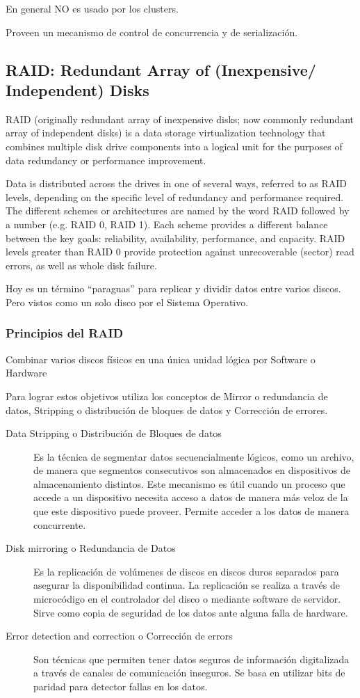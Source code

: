 \documentclass[a4paper, twoside]{article}
\begin{document}
En general NO es usado por los clusters.

Proveen un mecanismo de control de concurrencia y de serialización.

\subsection{RAID: Redundant Array of (Inexpensive/ Independent) Disks}
RAID (originally redundant array of inexpensive disks; now commonly redundant array of independent disks) is a data storage virtualization technology that combines multiple disk drive components into a logical unit for the purposes of data redundancy or performance improvement.

Data is distributed across the drives in one of several ways, referred to as RAID levels, depending on the specific level of redundancy and performance required. The different schemes or architectures are named by the word RAID followed by a number (e.g. RAID 0, RAID 1). Each scheme provides a different balance between the key goals: reliability, availability, performance, and capacity. RAID levels greater than RAID 0 provide protection against unrecoverable (sector) read errors, as well as whole disk failure.

Hoy es un término ``paraguas'' para replicar y dividir datos entre varios discos. Pero vistos como un solo disco por el Sistema Operativo.


\subsubsection{Principios del RAID}
Combinar varios discos físicos en una única unidad lógica por Software o Hardware

Para lograr estos objetivos utiliza los conceptos de Mirror o redundancia de datos, Stripping o distribución de bloques de datos y Corrección de errores.

\begin{description}
	\item[Data Stripping o Distribución de Bloques de datos] Es la técnica de segmentar datos secuencialmente lógicos, como un archivo, de manera que segmentos consecutivos son almacenados en dispositivos de almacenamiento distintos. Este mecanismo es útil cuando un proceso que accede a un dispositivo necesita acceso a datos de manera más veloz de la que este dispositivo puede proveer. Permite acceder a los datos de manera concurrente.

	\item[Disk mirroring o Redundancia de Datos] Es la replicación de volúmenes de discos en discos duros separados para asegurar la disponibilidad continua. La replicación se realiza a través de microcódigo en el controlador del disco o mediante software de servidor. Sirve como copia de seguridad de los datos ante alguna falla de hardware.

	\item[Error detection and correction o Corrección de errors] Son técnicas que permiten tener datos seguros de información digitalizada a través de canales de comunicación inseguros. Se basa en utilizar bits de paridad para detector fallas en los datos.
\end{description}
\end{document}
